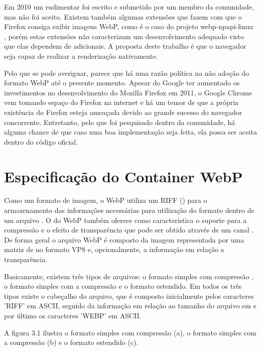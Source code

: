 \documentclass[espaco=simples,appendix=Name]{abnt}
\begin{document}
Em 2010 um  rudimentar foi escrito e submetido por um membro da comunidade, mas não foi aceito. Existem também algumas extensões que fazem com que o Firefox consiga exibir imagens WebP, como é o caso do projeto webp-npapi-linux \cite{webp-npapi-linux}, porém estas extensões não caracterizam um desenvolvimento adequado visto que elas dependem de  adicionais. A proposta deste trabalho é que o navegador seja capaz de realizar a renderização nativamente.

Pelo que se pode averiguar, parece que há uma razão política na não adoção do formato WebP até o presente momento. Apesar do Google ter aumentado os investimentos no desenvolvimento do Mozilla Firefox em 2011, o Google Chrome vem tomando espaço do Firefox na internet e há um temor de que a própria existência do Firefox esteja ameaçada devido ao grande sucesso do navegador concorrente. Entretanto, pelo que foi pesquisado dentro da comunidade, há alguma chance de que caso uma boa implementação seja feita, ela possa ser aceita dentro do código oficial.

\section{Especificação do Container WebP}

Como um formato de imagem, o WebP utiliza um  RIFF () para o armazenamento das informações necessárias para utilização do formato dentro de um arquivo \cite{RIFFContainer}. O  do WebP também oferece como característica o suporte para a compressão  e o efeito de transparência que pode ser obtido através de um canal . De forma geral o arquivo WebP é composto da imagem representada por uma matriz de  no formato VP8 e, opcionalmente, a informação em relação a transparência.

Basicamente, existem três tipos de arquivos: o formato simples com compressão , o formato simples com a compressão  e o formato estendido. Em todos os três tipos existe o cabeçalho do arquivo, que é composto inicialmente pelos caracteres 'RIFF' em ASCII, seguido da informação em relação ao tamanho do arquivo em  e por último os caracteres 'WEBP' em ASCII.

\newpage

A figura 3.1 ilustra o formato simples com compressão  (a), o formato simples com a compressão  (b) e o formato estendido (c).
\end{document}
